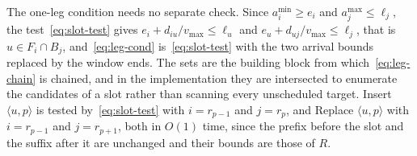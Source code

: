 The one-leg condition needs no separate check. Since $a^{\min}_i \ge e_i$ and $a^{\max}_j \le \ell_j$, the test~\eqref{eq:slot-test} gives $e_i + d_{iu}/v_{\max} \le \ell_u$ and $e_u + d_{uj}/v_{\max} \le \ell_j$, that is $u \in F_i \cap B_j$, and~\eqref{eq:leg-cond} is~\eqref{eq:slot-test} with the two arrival bounds replaced by the window ends. The sets are the building block from which~\eqref{eq:leg-chain} is chained, and in the implementation they are intersected to enumerate the candidates of a slot rather than scanning every unscheduled target. Insert $\langle u, p \rangle$ is tested by~\eqref{eq:slot-test} with $i = r_{p-1}$ and $j = r_p$, and Replace $\langle u, p \rangle$ with $i = r_{p-1}$ and $j = r_{p+1}$, both in $O(1)$ time, since the prefix before the slot and the suffix after it are unchanged and their bounds are those of $R$.

